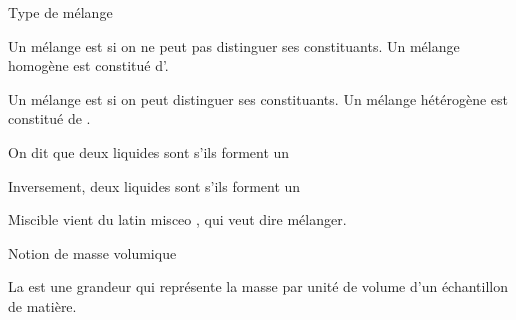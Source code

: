\begin{doc}{Type de mélange}
  \label{doc:type_melange}
  \vspace*{-24pt}
  \begin{encart}
    Un mélange est  si on ne peut pas distinguer ses constituants.
    Un mélange homogène est constitué d'.
  \end{encart}
  
  \begin{encart}
    Un mélange est  si on peut distinguer ses constituants.
    Un mélange hétérogène est constitué de .
  \end{encart}

  \begin{encart}
    On dit que deux liquides sont  s'ils forment un 
  \end{encart}
  \begin{encart}
    Inversement, deux liquides sont  s'ils forment un 
  \end{encart}
  Miscible vient du latin \og misceo \fg, qui veut dire mélanger.
\end{doc}

\newpage
\vspace*{-36pt}
\begin{doc}{Notion de masse volumique}
  \label{doc:masse_volumique}
  \vspace{-24pt}
  \begin{encart}
    La  est une grandeur qui représente la masse par unité de volume d'un échantillon de matière.
  \end{encart}

\end{doc}


